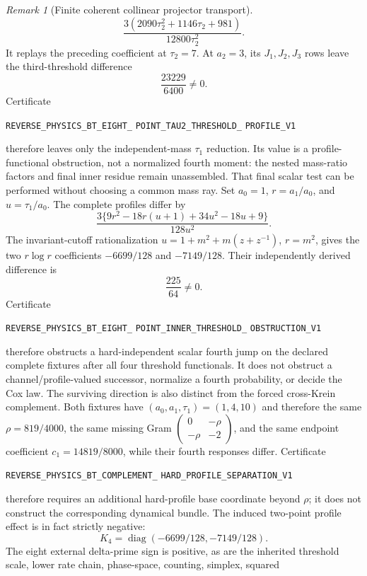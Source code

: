 \documentclass[11pt]{article}
\theoremstyle{definition}
\theoremstyle{remark}
\newtheorem{remark}[theorem]{Remark}
\begin{document}
\begin{remark}[Finite coherent collinear projector transport]
\[
 \frac{3(2090\tau_2^2+1146\tau_2+981)}{12800\tau_2^2}.
\]
It replays the preceding coefficient at $\tau_2=7$.  At $a_2=3$, its
$J_1,J_2,J_3$ rows leave the third-threshold difference
\[
 \frac{23229}{6400}\ne0.
\]
Certificate
\par\noindent
\texttt{REVERSE\_PHYSICS\_BT\_EIGHT\_}\allowbreak
\texttt{POINT\_TAU2\_THRESHOLD\_}\allowbreak
\texttt{PROFILE\_V1}
\par\noindent
therefore leaves only the independent-mass $\tau_1$ reduction.  Its value is
a profile-functional obstruction, not a normalized fourth moment: the nested
mass-ratio factors and final inner residue remain unassembled.
That final scalar test can be performed without choosing a common mass ray.
Set $a_0=1$, $r=a_1/a_0$, and $u=\tau_1/a_0$.  The complete profiles differ by
\[
 \frac{3\{9r^2-18r(u+1)+34u^2-18u+9\}}{128u^2}.
\]
The invariant-cutoff rationalization
$u=1+m^2+m(z+z^{-1})$, $r=m^2$, gives the two $r\log r$ coefficients
$-6699/128$ and $-7149/128$.  Their independently derived difference is
\[
 \frac{225}{64}\ne0.
\]
Certificate
\par\noindent
\texttt{REVERSE\_PHYSICS\_BT\_EIGHT\_}\allowbreak
\texttt{POINT\_INNER\_THRESHOLD\_}\allowbreak
\texttt{OBSTRUCTION\_V1}
\par\noindent
therefore obstructs a hard-independent scalar fourth jump on the declared
complete fixtures after all four threshold functionals.  It does not obstruct
a channel/profile-valued successor, normalize a fourth probability, or decide
the Cox law.
The surviving direction is also distinct from the forced cross-Krein
complement.  Both fixtures have $(a_0,a_1,\tau_1)=(1,4,10)$ and therefore the
same $\rho=819/4000$, the same missing Gram
$\left(\begin{smallmatrix}0&-\rho\\-\rho&-2\end{smallmatrix}\right)$, and the
same endpoint coefficient $c_1=14819/8000$, while their fourth responses
differ.  Certificate
\par\noindent
\texttt{REVERSE\_PHYSICS\_BT\_COMPLEMENT\_}\allowbreak
\texttt{HARD\_PROFILE\_SEPARATION\_V1}
\par\noindent
therefore requires an additional hard-profile base coordinate beyond $\rho$;
it does not construct the corresponding dynamical bundle.
The induced two-point profile effect is in fact strictly negative:
\[
 K_4=\operatorname{diag}(-6699/128,-7149/128).
\]
The eight external delta-prime sign is positive, as are the inherited
threshold scale, lower rate chain, phase-space, counting, simplex, squared

\end{remark}
\end{document}
